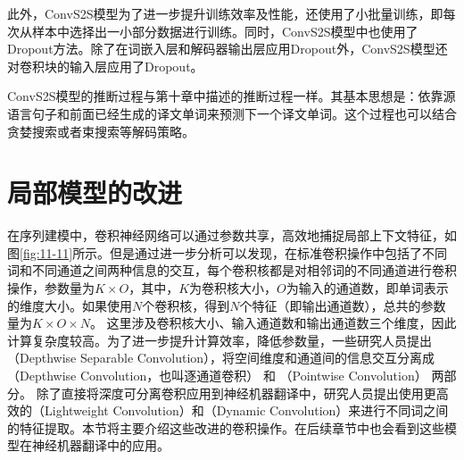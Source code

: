 \parinterval 此外，ConvS2S模型为了进一步提升训练效率及性能，还使用了小批量训练，即每次从样本中选择出一小部分数据进行训练。同时，ConvS2S模型中也使用了Dropout方法。除了在词嵌入层和解码器输出层应用Dropout外，ConvS2S模型还对卷积块的输入层应用了Dropout。

\parinterval ConvS2S模型的推断过程与第十章中描述的推断过程一样。其基本思想是：依靠源语言句子和前面已经生成的译文单词来预测下一个译文单词。这个过程也可以结合贪婪搜索或者束搜索等解码策略。


\section{局部模型的改进}

\parinterval 在序列建模中，卷积神经网络可以通过参数共享，高效地捕捉局部上下文特征，如图\ref{fig:11-11}所示。但是通过进一步分析可以发现，在标准卷积操作中包括了不同词和不同通道之间两种信息的交互，每个卷积核都是对相邻词的不同通道进行卷积操作，参数量为$K \times O$，其中，$K$为卷积核大小，$O$为输入的通道数，即单词表示的维度大小。如果使用$N$个卷积核，得到$N$个特征（即输出通道数），总共的参数量为$K \times O \times N$。 这里涉及卷积核大小、输入通道数和输出通道数三个维度，因此计算复杂度较高。为了进一步提升计算效率，降低参数量，一些研究人员提出{\small{}}（Depthwise Separable Convolution），将空间维度和通道间的信息交互分离成{\small{}}（Depthwise Convolution，也叫逐通道卷积） 和{\small{}} （Pointwise Convolution） 两部分。 除了直接将深度可分离卷积应用到神经机器翻译中，研究人员提出使用更高效的{\small{}}（Lightweight Convolution）和{\small{}}（Dynamic Convolution）来进行不同词之间的特征提取。本节将主要介绍这些改进的卷积操作。在后续章节中也会看到这些模型在神经机器翻译中的应用。


